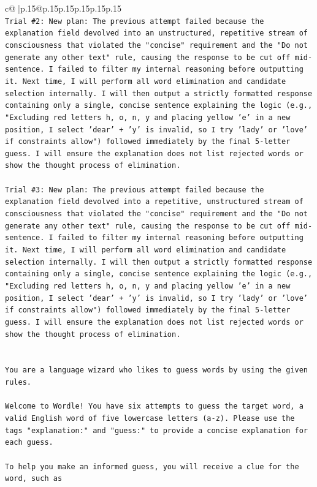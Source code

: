 \documentclass{article}
\begin{document}
{\begin{supertabular}{c@{$\;$}|p{.15\linewidth}@{}p{.15\linewidth}p{.15\linewidth}p{.15\linewidth}p{.15\linewidth}p{.15\linewidth}}
{{{\\ 
\texttt{Trial \#2: New plan: The previous attempt failed because the explanation field devolved into an unstructured, repetitive stream of consciousness that violated the "concise" requirement and the "Do not generate any other text" rule, causing the response to be cut off mid{-}sentence. I failed to filter my internal reasoning before outputting it. Next time, I will perform all word elimination and candidate selection internally. I will then output a strictly formatted response containing only a single, concise sentence explaining the logic (e.g., "Excluding red letters h, o, n, y and placing yellow 'e' in a new position, I select 'dear' + 'y' is invalid, so I try 'lady' or 'love' if constraints allow") followed immediately by the final 5{-}letter guess. I will ensure the explanation does not list rejected words or show the thought process of elimination.} \\
\\ 
\texttt{Trial \#3: New plan: The previous attempt failed because the explanation field devolved into a repetitive, unstructured stream of consciousness that violated the "concise" requirement and the "Do not generate any other text" rule, causing the response to be cut off mid{-}sentence. I failed to filter my internal reasoning before outputting it. Next time, I will perform all word elimination and candidate selection internally. I will then output a strictly formatted response containing only a single, concise sentence explaining the logic (e.g., "Excluding red letters h, o, n, y and placing yellow 'e' in a new position, I select 'dear' + 'y' is invalid, so I try 'lady' or 'love' if constraints allow") followed immediately by the final 5{-}letter guess. I will ensure the explanation does not list rejected words or show the thought process of elimination.} \\
\\ 
\\ 
\texttt{You are a language wizard who likes to guess words by using the given rules.} \\
\\ 
\texttt{Welcome to Wordle! You have six attempts to guess the target word, a valid English word of five lowercase letters (a{-}z). Please use the tags "explanation:" and "guess:" to provide a concise explanation for each guess.} \\
\\ 
\texttt{To help you make an informed guess, you will receive a clue for the word, such as} \\
}}}
\end{supertabular}}
\end{document}
